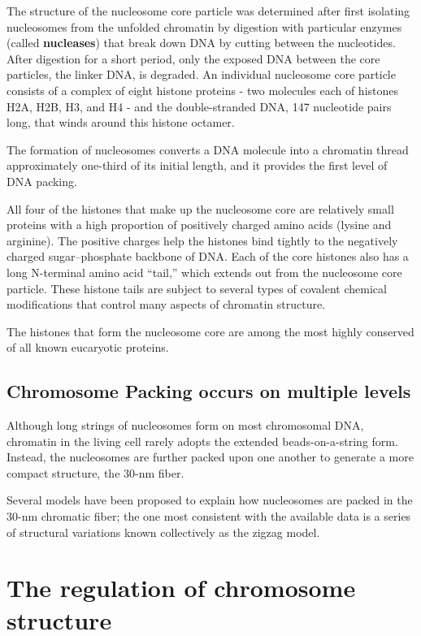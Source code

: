 The structure of the nucleosome core particle was determined after first
isolating nucleosomes from the unfolded chromatin by digestion with
particular enzymes (called \textbf{nucleases}) that break down DNA by cutting
between the nucleotides. After digestion for a short period, only the
exposed DNA between the core particles, the linker DNA, is degraded.
An individual nucleosome core particle consists of a complex of eight
histone proteins - two molecules each of histones H2A, H2B, H3, and
H4 - and the double-stranded DNA, 147 nucleotide pairs long, that winds
around this histone octamer.

The formation of nucleosomes converts a DNA molecule
into a chromatin thread approximately one-third of its initial length, and
it provides the first level of DNA packing.

All four of the histones that make up the nucleosome core are relatively
small proteins with a high proportion of positively charged amino acids
(lysine and arginine). The positive charges help the histones bind tightly
to the negatively charged sugar–phosphate backbone of DNA.
Each of the core histones also has a long
N-terminal amino acid “tail,” which extends out from the nucleosome
core particle. These histone tails are subject to several
types of covalent chemical modifications that control many aspects of
chromatin structure.

The histones that form the nucleosome core are among the most highly
conserved of all known eucaryotic proteins.

\subsection{Chromosome Packing occurs on multiple levels}

Although long strings of nucleosomes form on most chromosomal DNA,
chromatin in the living cell rarely adopts the extended beads-on-a-string
form. Instead, the nucleosomes are further packed
upon one another to generate a more compact structure, the 30-nm
fiber.

Several models have been proposed to explain how nucleosomes are packed in the 30-nm
chromatic fiber; the one most consistent with the available data is a series of structural
variations known collectively as the zigzag model.

\section{The regulation of chromosome structure}

